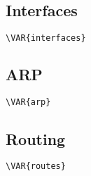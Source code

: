 \documentclass[a4paper]{article}
\begin{document}
\begin{center}
\end{center}



\subsection{Interfaces}


\begin{lstlisting}[language=Bash, caption=ip address show]
\VAR{interfaces}
\end{lstlisting}

\subsection{ARP}


\begin{lstlisting}[language=Bash, caption=ip neigh show]
\VAR{arp}
\end{lstlisting}


\subsection{Routing}


\begin{lstlisting}[language=Bash, caption=ip route list]
\VAR{routes}
\end{lstlisting}
\end{document}
